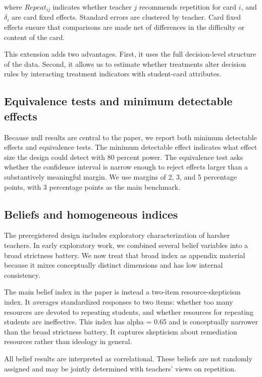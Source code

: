 \documentclass[12pt,a4paper]{article}
\begin{document}
where $Repeat_{ij}$ indicates whether teacher $j$ recommends repetition for card $i$, and $\delta_i$ are card fixed effects. Standard errors are clustered by teacher. Card fixed effects ensure that comparisons are made net of differences in the difficulty or content of the card.

This extension adds two advantages. First, it uses the full decision-level structure of the data. Second, it allows us to estimate whether treatments alter decision rules by interacting treatment indicators with student-card attributes.

\subsection{Equivalence tests and minimum detectable effects}

Because null results are central to the paper, we report both minimum detectable effects and equivalence tests. The minimum detectable effect indicates what effect size the design could detect with 80 percent power. The equivalence test asks whether the confidence interval is narrow enough to reject effects larger than a substantively meaningful margin. We use margins of 2, 3, and 5 percentage points, with 3 percentage points as the main benchmark.

\subsection{Beliefs and homogeneous indices}

The preregistered design includes exploratory characterization of harsher teachers. In early exploratory work, we combined several belief variables into a broad strictness battery. We now treat that broad index as appendix material because it mixes conceptually distinct dimensions and has low internal consistency.

The main belief index in the paper is instead a two-item resource-skepticism index. It averages standardized responses to two items: whether too many resources are devoted to repeating students, and whether resources for repeating students are ineffective. This index has alpha = 0.65 and is conceptually narrower than the broad strictness battery. It captures skepticism about remediation resources rather than ideology in general.

All belief results are interpreted as correlational. These beliefs are not randomly assigned and may be jointly determined with teachers' views on repetition.
\end{document}

